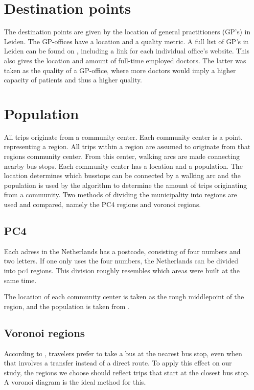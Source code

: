 \section{Destination points}
The destination points are given by the location of general practitioners (GP's) in Leiden. The GP-offices have a location and a quality metric. A full list of GP's in Leiden can be found on \cite{zorgkaart}, including a link for each individual office's website. This also gives the location and amount of full-time employed doctors. The latter was taken as the quality of a GP-office, where more doctors would imply a higher capacity of patients and thus a higher quality.

\section{Population}
All trips originate from a community center. Each community center is a point, representing a region. All trips within a region are assumed to originate from that regions community center. From this center, walking arcs are made connecting nearby bus stops. Each community center has a location and a population. The location determines which busstops can be connected by a walking arc and the population is used by the algorithm to determine the amount of trips originating from a community. Two methods of dividing the municipality into regions are used and compared, namely the PC4 regions and voronoi regions.
\subsection{PC4}
Each adress in the Netherlands has a postcode, consisting of four numbers and two letters. If one only uses the four numbers, the Netherlands can be divided into pc4 regions. This division roughly resembles which areas were built at the same time.

The location of each community center is taken as the rough middlepoint of the region, and the population is taken from \cite{allecijfers}.

\subsection{Voronoi regions}

According to \cite{wang}, travelers prefer to take a bus at the nearest bus stop, even when that involves a transfer instead of a direct route. To apply this effect on our study, the regions we choose should reflect trips that start at the closest bus stop. A voronoi diagram is the ideal method for this.

